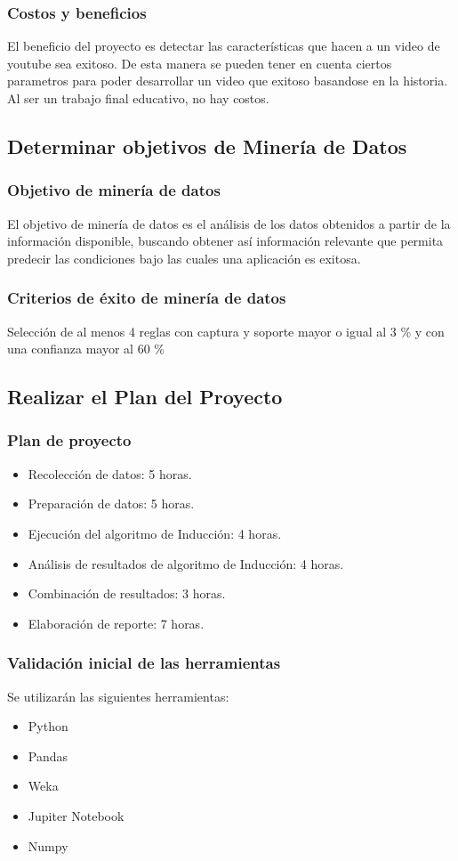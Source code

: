     \subsubsection{Costos y beneficios}
        El beneficio del proyecto es detectar las características que hacen a
        un video de youtube sea exitoso. De esta manera se pueden tener en
        cuenta ciertos parametros para poder desarrollar un video que exitoso
        basandose en la historia.
        Al ser un trabajo final educativo, no hay costos.
\subsection{Determinar objetivos de Minería de Datos}
    \subsubsection{Objetivo de minería de datos}
    El objetivo de minería de datos es el análisis de los datos obtenidos a
    partir de la información disponible, buscando obtener así información
    relevante que permita predecir las condiciones bajo las cuales una
    aplicación es exitosa.
    \subsubsection{Criterios de éxito de minería de datos}
    Selección de al menos 4 reglas con captura y soporte mayor o igual al 3 \%
    y con una confianza mayor al 60 \%
\subsection{Realizar el Plan del Proyecto}
    \subsubsection{Plan de proyecto}
        \begin{itemize}
            \item Recolección de datos: 5 horas.
            \item Preparación de datos: 5 horas.
            \item Ejecución del algoritmo de Inducción: 4 horas.
            \item Análisis de resultados de algoritmo de Inducción: 4 horas.
            \item Combinación de resultados: 3 horas.
            \item Elaboración de reporte: 7 horas.
        \end{itemize}
    \subsubsection{Validación inicial de las herramientas}
        Se utilizarán las siguientes herramientas:
        \begin{itemize}
            \item Python
            \item Pandas
            \item Weka
            \item Jupiter Notebook
            \item Numpy
        \end{itemize}
